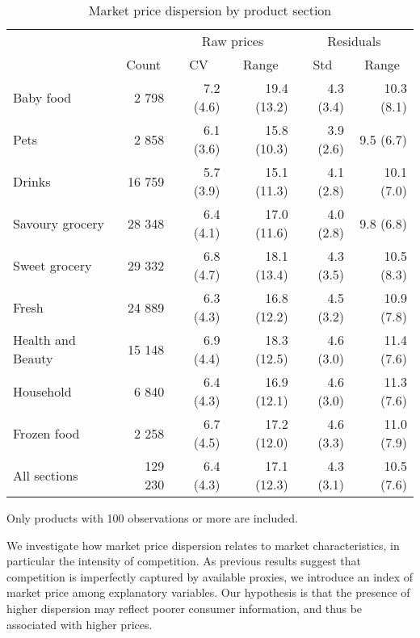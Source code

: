 \documentclass[english]{article}
\begin{document}
\begin{table}
\caption{Market price dispersion by product section}
\label{tab:stats_market_dispersion}
\small
\begin{threeparttable}
\begin{tabular}{lrrrrr}
\toprule
      & \multicolumn{1}{c}{} & \multicolumn{2}{c}{Raw prices} & \multicolumn{2}{c}{Residuals} \\
      & \multicolumn{1}{c}{Count} & \multicolumn{1}{c}{CV} & \multicolumn{1}{c}{Range} & \multicolumn{1}{c}{Std} & \multicolumn{1}{c}{Range} \\
\midrule
Baby food & 2 798 & 7.2 (4.6) & 19.4 (13.2) & 4.3 (3.4) & 10.3 (8.1) \\
Pets  & 2 858 & 6.1 (3.6) & 15.8 (10.3) & 3.9 (2.6) & 9.5 (6.7) \\
Drinks & 16 759 & 5.7 (3.9) & 15.1 (11.3) & 4.1 (2.8) & 10.1 (7.0) \\
Savoury grocery & 28 348 & 6.4 (4.1) & 17.0 (11.6) & 4.0 (2.8) & 9.8 (6.8) \\
Sweet grocery & 29 332 & 6.8 (4.7) & 18.1 (13.4) & 4.3 (3.5) & 10.5 (8.3) \\
Fresh & 24 889 & 6.3 (4.3) & 16.8 (12.2) & 4.5 (3.2) & 10.9 (7.8) \\
Health and Beauty & 15 148 & 6.9 (4.4) & 18.3 (12.5) & 4.6 (3.0) & 11.4 (7.6) \\
Household & 6 840 & 6.4 (4.3) & 16.9 (12.1) & 4.6 (3.0) & 11.3 (7.6) \\
Frozen food & 2 258 & 6.7 (4.5) & 17.2 (12.0) & 4.6 (3.3) & 11.0 (7.9) \\
\midrule
All sections & 129 230 & 6.4 (4.3) & 17.1 (12.3) & 4.3 (3.1) & 10.5 (7.6) \\
\bottomrule
\bottomrule
\end{tabular}
\begin{tablenotes}
      \small
      \item Only products with 100 observations or more are included.
\end{tablenotes}
\end{threeparttable}
\end{table}

We investigate how market price dispersion relates to market characteristics, in particular the intensity of competition. As previous results suggest that competition is imperfectly captured by available proxies, we introduce an index of market price among explanatory variables. Our hypothesis is that the presence of higher dispersion may reflect poorer consumer information, and thus be associated with higher prices.
\end{document}

